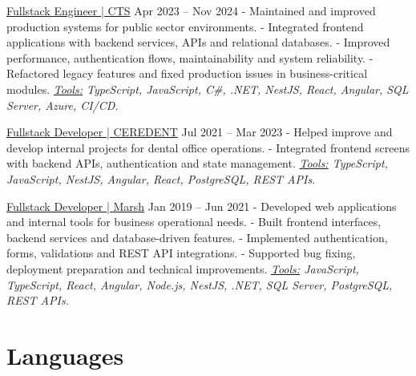 \documentclass[letterpaper]{twentysecondcv}
\begin{document}
\newline
{\large\underline{Fullstack Engineer | CTS}} \hfill Apr 2023 -- Nov 2024
\newline
\newline- Maintained and improved production systems for public sector environments.
\newline- Integrated frontend applications with backend services, APIs and relational databases.
\newline- Improved performance, authentication flows, maintainability and system reliability.
\newline- Refactored legacy features and fixed production issues in business-critical modules.
\newline
\newline\textit{\underline{Tools:} TypeScript, JavaScript, C\#, .NET, NestJS, React, Angular, SQL Server, Azure, CI/CD.}
\newline

\newline
{\large\underline{Fullstack Developer | CEREDENT}} \hfill Jul 2021 -- Mar 2023
\newline
\newline- Helped improve and develop internal projects for dental office operations.
\newline- Integrated frontend screens with backend APIs, authentication and state management.
\newline
\newline\textit{\underline{Tools:} TypeScript, JavaScript, NestJS, Angular, React, PostgreSQL, REST APIs.}
\newline

\newline
{\large\underline{Fullstack Developer | Marsh}} \hfill Jan 2019 -- Jun 2021
\newline
\newline- Developed web applications and internal tools for business operational needs.
\newline- Built frontend interfaces, backend services and database-driven features.
\newline- Implemented authentication, forms, validations and REST API integrations.
\newline- Supported bug fixing, deployment preparation and technical improvements.
\newline
\newline\textit{\underline{Tools:} JavaScript, TypeScript, React, Angular, Node.js, NestJS, .NET, SQL Server, PostgreSQL, REST APIs.}
\newline


\section{Languages}

\begin{twenty}
\end{twenty}
\end{document}
